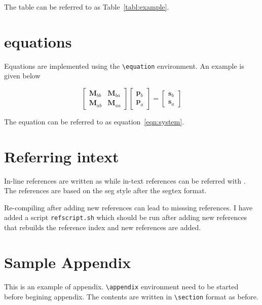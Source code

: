\documentclass{edger}
\begin{document}
The table can be referred to as Table~\ref{tabl:example}.

\lipsum[1-7]  
\section*{equations}

Equations are implemented using the \verb|\equation| environment. An example is given below

\begin{equation}
\begin{bmatrix}
\mathbf{M}_{bb} & \mathbf{M}_{ba} \\
\mathbf{M}_{ab} & \mathbf{M}_{aa}
\end{bmatrix}
\begin{bmatrix}
\mathbf{p}_{b}  \\
\mathbf{p}_{a} 
\end{bmatrix}
=
\begin{bmatrix}
\mathbf{s}_{b}  \\
\mathbf{s}_{a} 
\end{bmatrix}
\label{eqn:system}
\end{equation}

The equation can be referred to as equation~\ref{eqn:system}.

\lipsum[1-7]  

\section*{Referring intext}
In-line references are written as \cite{knuth1989} while in-text references can be referred with \cite[]{knuth1989}. The references are based on the seg style after the segtex format.

Re-compiling after adding new references can lead to misssing references. I have added a script \verb|refscript.sh| which should be run after adding new references that rebuilds the reference index and new references are added. 




\newpage



\appendix %

\section{Sample Appendix} 

This is an example of appendix. \verb|\appendix| environment need to be started before begining appendix. The contents are written in \verb|\section| format as before.
\end{document}
